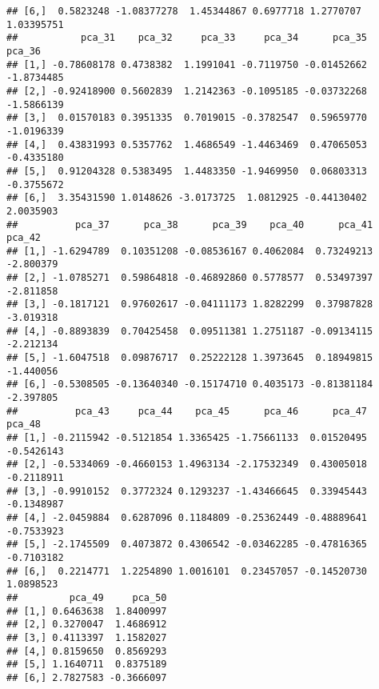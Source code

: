 \documentclass[
]{article}
\begin{document}
\begin{verbatim}
## [6,]  0.5823248 -1.08377278  1.45344867 0.6977718 1.2770707  1.03395751
##           pca_31    pca_32     pca_33     pca_34      pca_35     pca_36
## [1,] -0.78608178 0.4738382  1.1991041 -0.7119750 -0.01452662 -1.8734485
## [2,] -0.92418900 0.5602839  1.2142363 -0.1095185 -0.03732268 -1.5866139
## [3,]  0.01570183 0.3951335  0.7019015 -0.3782547  0.59659770 -1.0196339
## [4,]  0.43831993 0.5357762  1.4686549 -1.4463469  0.47065053 -0.4335180
## [5,]  0.91204328 0.5383495  1.4483350 -1.9469950  0.06803313 -0.3755672
## [6,]  3.35431590 1.0148626 -3.0173725  1.0812925 -0.44130402  2.0035903
##          pca_37      pca_38      pca_39    pca_40      pca_41    pca_42
## [1,] -1.6294789  0.10351208 -0.08536167 0.4062084  0.73249213 -2.800379
## [2,] -1.0785271  0.59864818 -0.46892860 0.5778577  0.53497397 -2.811858
## [3,] -0.1817121  0.97602617 -0.04111173 1.8282299  0.37987828 -3.019318
## [4,] -0.8893839  0.70425458  0.09511381 1.2751187 -0.09134115 -2.212134
## [5,] -1.6047518  0.09876717  0.25222128 1.3973645  0.18949815 -1.440056
## [6,] -0.5308505 -0.13640340 -0.15174710 0.4035173 -0.81381184 -2.397805
##          pca_43     pca_44    pca_45      pca_46      pca_47     pca_48
## [1,] -0.2115942 -0.5121854 1.3365425 -1.75661133  0.01520495 -0.5426143
## [2,] -0.5334069 -0.4660153 1.4963134 -2.17532349  0.43005018 -0.2118911
## [3,] -0.9910152  0.3772324 0.1293237 -1.43466645  0.33945443 -0.1348987
## [4,] -2.0459884  0.6287096 0.1184809 -0.25362449 -0.48889641 -0.7533923
## [5,] -2.1745509  0.4073872 0.4306542 -0.03462285 -0.47816365 -0.7103182
## [6,]  0.2214771  1.2254890 1.0016101  0.23457057 -0.14520730  1.0898523
##         pca_49     pca_50
## [1,] 0.6463638  1.8400997
## [2,] 0.3270047  1.4686912
## [3,] 0.4113397  1.1582027
## [4,] 0.8159650  0.8569293
## [5,] 1.1640711  0.8375189
## [6,] 2.7827583 -0.3666097
\end{verbatim}
\end{document}

